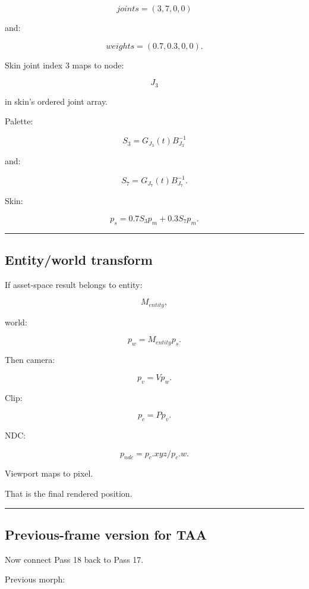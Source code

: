 \[
joints=
(3,7,0,0)
\]

and:

\[
weights=
(0.7,0.3,0,0).
\]

Skin joint index 3 maps to node:

\[
J_3
\]

in skin's ordered joint array.

Palette:

\[
S_3=
G_{J_3}(t)
B_{J_3}^{-1}
\]

and:

\[
S_7=
G_{J_7}(t)
B_{J_7}^{-1}.
\]

Skin:

\[
\boxed{
p_s
=
0.7S_3p_m
+
0.3S_7p_m.
}
\]

\begin{center}\rule{0.5\linewidth}{0.5pt}\end{center}

\subsection{Entity/world transform}\label{04-visual-computing-ii-ch041-entityworld-transform}

If asset-space result belongs to entity:

\[
M_{entity},
\]

world:

\[
\boxed{
p_w=
M_{entity}p_s.
}
\]

Then camera:

\[
p_v=
Vp_w.
\]

Clip:

\[
\boxed{
p_c=
Pp_v.
}
\]

NDC:

\[
p_{ndc}
=
p_c.xyz/p_c.w.
\]

Viewport maps to pixel.

That is the final rendered position.

\begin{center}\rule{0.5\linewidth}{0.5pt}\end{center}

\subsection{Previous-frame version for TAA}\label{04-visual-computing-ii-ch041-previous-frame-version-for-taa}

Now connect Pass 18 back to Pass 17.

Previous morph:


